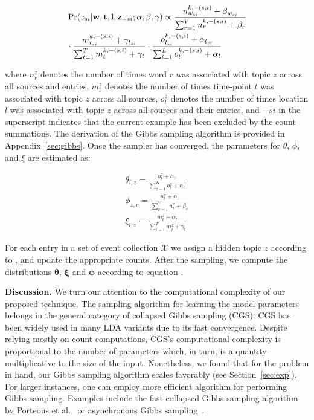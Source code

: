 \documentclass[twoside,leqno,twocolumn]{article}
\newcommand{\w}{{\bf w}}
\newcommand{\z}{{\bf z}}
\newcommand{\loc}{{\bf l}}
\newcommand{\tim}{{\bf t}}
\begin{document}
\begin{align}
\label{eq:conditional}
&\Pr(z_{si}| \w,\tim,\loc,\z_{-si};\alpha,\beta,\gamma) \propto \frac{n^{k,-(s,i)}_{w_{si}} + \beta_{w_{si}}}{\sum_{r = 1}^V n^{k,-(s,i)}_{r} + \beta_{r}}  \nonumber \\
& \cdot \frac{m^{k,-(s,i)}_{t_{si}} + \gamma_{t_{si}}}{\sum_{t = 1}^T m^{k,-(s,i)}_{t} + \gamma_{t}} \cdot \frac{o^{k,-(s,i)}_{l_{si}} + \alpha_{l_{si}}}{\sum_{l = 1}^L o^{k,-(s,i)}_{l} + \alpha_{l}}
\end{align}

\noindent where $n^{z}_{r}$ denotes the number of times word $r$ was associated with topic $z$ across all sources and entries, $m^{z}_{t}$ denotes the number of times time-point $t$ was associated with topic $z$ across all sources, $o^z_l$ denotes the number of times location $l$ was associated with topic $z$ across all sources and their entries, and $-si$ in the superscript indicates that the current example has been excluded by the count summations. The derivation of the Gibbs sampling algorithm is provided in Appendix~\ref{sec:gibbs}. Once the sampler has converged, the parameters for $\theta$, $\phi$, and $\xi$ are estimated as:

\begin{align}
\label{eq:updates}
\theta_{l,z} = \frac{o^z_l + \alpha_l}{\sum_{z=1}^K o^z_l + \alpha_l} \nonumber \\
\phi_{z,v} = \frac{n^z_l + \alpha_l}{\sum_{v=1}^V n^z_v + \beta_v}  \\
\xi_{l,z} = \frac{m^z_t + \alpha_l}{\sum_{t=1}^T m^z_t + \gamma_t} \nonumber
\end{align}

For each entry in a set of event collection $\mathcal{X}$ we assign a hidden topic $z$ according to , and update the appropriate counts. After the sampling, we compute the distributions ${\boldsymbol \theta}$, ${\boldsymbol \xi}$ and ${\boldsymbol \phi}$ according to equation .   

\vspace{5pt}\noindent\textbf{Discussion.} We turn our attention to the computational complexity of our proposed technique. The sampling algorithm for learning the model parameters belongs in the general category of  collapsed Gibbs sampling (CGS). CGS has been widely used in many LDA variants due to its fast convergence. Despite relying mostly on count computations, CGS's computational complexity is proportional to the number of parameters which, in turn, is a quantity multiplicative to the size of the input. Nonetheless, we found that for the problem in hand, our Gibbs sampling algorithm scales favorably (see Section~\ref{sec:exp}). For larger instances, one can employ more efficient algorithm for performing Gibbs sampling. Examples include the fast collapsed Gibbs sampling algorithm by Porteous et al.~\cite{Porteous:2008:FCG:1401890.1401960} or asynchronous Gibbs sampling~\cite{NIPS2011_4390,Zhang:2014:DSM:2732977.2733001}. 
\end{document}

